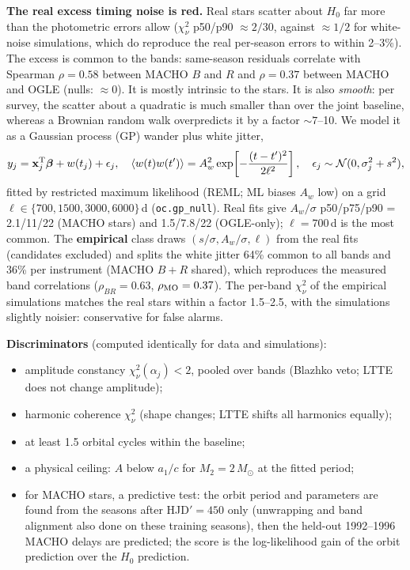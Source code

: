 \documentclass[11pt]{article}
\newcommand{\Msun}{\ensuremath{M_\odot}}
\begin{document}
\textbf{The real excess timing noise is red.} Real stars scatter about $H_0$ far more than the photometric errors allow
($\chi^2_\nu$ p50/p90 $\approx2/30$, against $\approx1/2$ for white-noise simulations, which do reproduce the real per-season
errors to within 2--3\%). The excess is common to the bands: same-season residuals correlate with Spearman $\rho=0.58$ between
MACHO $B$ and $R$ and $\rho=0.37$ between MACHO and OGLE (nulls: $\approx0$). It is mostly intrinsic to the stars. It is also
\emph{smooth}: per survey, the scatter about a quadratic is much smaller than over the joint baseline, whereas a Brownian random
walk overpredicts it by a factor $\sim7$--10. We model it as a Gaussian process (GP) wander plus white jitter,
\begin{equation}
y_j=\mathbf x_j^{\rm T}\bm\beta+w(t_j)+\epsilon_j,\quad
\langle w(t)w(t')\rangle=A_w^2\exp\!\left[-\frac{(t-t')^2}{2\ell^2}\right],\quad \epsilon_j\sim\mathcal N(0,\sigma_j^2+s^2),
\end{equation}
fitted by restricted maximum likelihood (REML; ML biases $A_w$ low) on a grid $\ell\in\{700,1500,3000,6000\}$\,d
(\texttt{oc.gp\_null}). Real fits give $A_w/\sigma$ p50/p75/p90 = 2.1/11/22 (MACHO stars) and 1.5/7.8/22 (OGLE-only);
$\ell=700$\,d is the most common. The \textbf{empirical} class draws $(s/\sigma,A_w/\sigma,\ell)$ from the real fits
(candidates excluded) and splits the white jitter 64\% common to all bands and 36\% per instrument (MACHO $B+R$ shared), which
reproduces the measured band correlations ($\rho_{BR}=0.63$, $\rho_{\rm MO}=0.37$). The per-band $\chi^2_\nu$ of the empirical
simulations matches the real stars within a factor 1.5--2.5, with the simulations slightly noisier: conservative for false alarms.

\textbf{Discriminators} (computed identically for data and simulations):
\begin{itemize}[leftmargin=*]
\item amplitude constancy $\chi^2_\nu(\alpha_j)<2$, pooled over bands (Blazhko veto; LTTE does not change amplitude);
\item harmonic coherence $\chi^2_\nu$ (shape changes; LTTE shifts all harmonics equally);
\item at least 1.5 orbital cycles within the baseline;
\item a physical ceiling: $A$ below $a_1/c$ for $M_2=2\,\Msun$ at the fitted period;
\item for MACHO stars, a predictive test: the orbit period and parameters are found from the seasons after HJD$'=450$ only
(unwrapping and band alignment also done on these training seasons), then the held-out 1992--1996 MACHO delays are predicted;
the score is the log-likelihood gain of the orbit prediction over the $H_0$ prediction.
\end{itemize}
\end{document}
